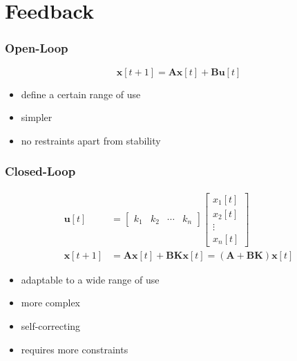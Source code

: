 \documentclass[aspectratio=169]{beamer}
\begin{document}
\section{Feedback}

\begin{frame}
    \frametitle{Open-Loop}

    \begin{equation}
        \bm{x}[t + 1] = \bm{Ax}[t] + \bm{Bu}[t]
    \end{equation}

    \begin{itemize}
        \item define a certain range of use
        \item simpler
        \item no restraints apart from stability
    \end{itemize}
\end{frame}

\begin{frame}
    \frametitle{Closed-Loop}

    \begin{align}
        \bm{u}[t] &=
        \begin{bmatrix}
            k_1 & k_2 & \cdots & k_n
        \end{bmatrix}
        \begin{bmatrix}
            x_1[t] \\
            x_2[t] \\
            \vdots \\
            x_n[t]
        \end{bmatrix} \\
        \bm{x}[t + 1] &= \bm{Ax}[t] + \bm{BKx}[t] = (\bm{A} + \bm{BK}) \bm{x}[t]
    \end{align}

    \begin{itemize}
        \item adaptable to a wide range of use
        \item more complex
        \item self-correcting
        \item requires more constraints
    \end{itemize}
\end{frame}
\end{document}
